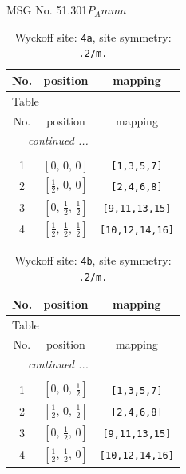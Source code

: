 \documentclass[fleqn,8pt]{jsarticle}
\begin{document}
\setcounter{MaxMatrixCols}{32}

\renewcommand{\tablename}{Table~}
\renewcommand{\figurename}{Figure~}
\begin{center}
\LARGE
MSG No. 51.301\quad$P_{A}mma$
\end{center}
\renewcommand{\arraystretch}{1.2}
\begin{longtable}{ccc}
\caption{Wyckoff site: {\tt 4a}, site symmetry: {\tt .2/m.}}
 \\
 \hline \hline
No. & position & mapping \\ \hline \endfirsthead

\multicolumn{2}{l}{\tablename\ \thetable{}} \\
 \hline \hline
No. & position & mapping \\ \hline \endhead

 \hline \hline
\multicolumn{2}{r}{\footnotesize\it continued ...} \\ \endfoot

 \hline \hline
\multicolumn{2}{r}{} \\ \endlastfoot

1 & $\left[ 0,\, 0,\, 0 \right]$ & {\tt [1,3,5,7]} \\ \hline
2 & $\left[ \frac{1}{2},\, 0,\, 0 \right]$ & {\tt [2,4,6,8]} \\ \hline
3 & $\left[ 0,\, \frac{1}{2},\, \frac{1}{2} \right]$ & {\tt [9,11,13,15]} \\ \hline
4 & $\left[ \frac{1}{2},\, \frac{1}{2},\, \frac{1}{2} \right]$ & {\tt [10,12,14,16]} \\
\end{longtable}
\renewcommand{\arraystretch}{1.2}
\begin{longtable}{ccc}
\caption{Wyckoff site: {\tt 4b}, site symmetry: {\tt .2/m.}}
 \\
 \hline \hline
No. & position & mapping \\ \hline \endfirsthead

\multicolumn{2}{l}{\tablename\ \thetable{}} \\
 \hline \hline
No. & position & mapping \\ \hline \endhead

 \hline \hline
\multicolumn{2}{r}{\footnotesize\it continued ...} \\ \endfoot

 \hline \hline
\multicolumn{2}{r}{} \\ \endlastfoot

1 & $\left[ 0,\, 0,\, \frac{1}{2} \right]$ & {\tt [1,3,5,7]} \\ \hline
2 & $\left[ \frac{1}{2},\, 0,\, \frac{1}{2} \right]$ & {\tt [2,4,6,8]} \\ \hline
3 & $\left[ 0,\, \frac{1}{2},\, 0 \right]$ & {\tt [9,11,13,15]} \\ \hline
4 & $\left[ \frac{1}{2},\, \frac{1}{2},\, 0 \right]$ & {\tt [10,12,14,16]} \\
\end{longtable}
\end{document}
